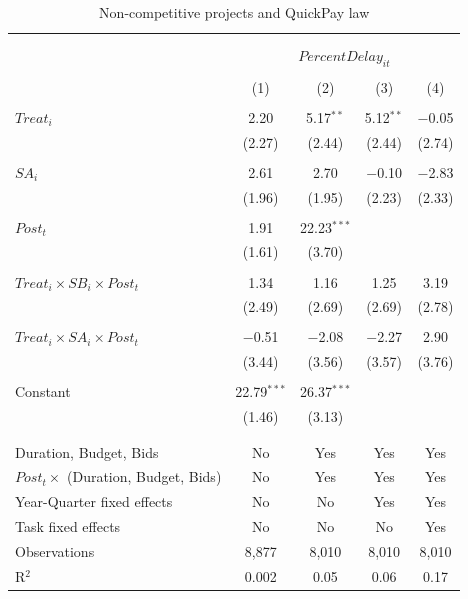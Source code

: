 \documentclass[
]{article}
\begin{document}
\begin{table}[H] \centering 
  \caption{Non-competitive projects and QuickPay law} 
  \label{} 
\small 
\begin{tabular}{@{\extracolsep{-2pt}}lcccc} 
\\[-1.8ex]\hline 
\hline \\[-1.8ex] 
\\[-1.8ex] & \multicolumn{4}{c}{$PercentDelay_{it}$  } \\ 
\\[-1.8ex] & (1) & (2) & (3) & (4)\\ 
\hline \\[-1.8ex] 
 $Treat_i$ & 2.20 & 5.17$^{**}$ & 5.12$^{**}$ & $-$0.05 \\ 
  & (2.27) & (2.44) & (2.44) & (2.74) \\ 
  & & & & \\ 
 $SA_i$ & 2.61 & 2.70 & $-$0.10 & $-$2.83 \\ 
  & (1.96) & (1.95) & (2.23) & (2.33) \\ 
  & & & & \\ 
 $Post_t$ & 1.91 & 22.23$^{***}$ &  &  \\ 
  & (1.61) & (3.70) &  &  \\ 
  & & & & \\ 
 $Treat_i \times SB_i \times Post_t$ & 1.34 & 1.16 & 1.25 & 3.19 \\ 
  & (2.49) & (2.69) & (2.69) & (2.78) \\ 
  & & & & \\ 
 $Treat_i \times SA_i \times Post_t$ & $-$0.51 & $-$2.08 & $-$2.27 & 2.90 \\ 
  & (3.44) & (3.56) & (3.57) & (3.76) \\ 
  & & & & \\ 
 Constant & 22.79$^{***}$ & 26.37$^{***}$ &  &  \\ 
  & (1.46) & (3.13) &  &  \\ 
  & & & & \\ 
\hline \\[-1.8ex] 
Duration, Budget, Bids & No & Yes & Yes & Yes \\ 
$Post_t \times $  (Duration, Budget, Bids) & No & Yes & Yes & Yes \\ 
Year-Quarter fixed effects & No & No & Yes & Yes \\ 
Task fixed effects & No & No & No & Yes \\ 
Observations & 8,877 & 8,010 & 8,010 & 8,010 \\ 
R$^{2}$ & 0.002 & 0.05 & 0.06 & 0.17 \\ 

\end{tabular}
\end{table}
\end{document}
